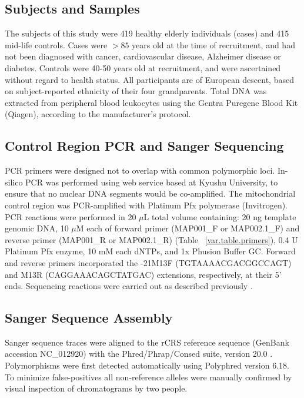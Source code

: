 \subsection{Subjects and Samples}\label{methods.samples}
The subjects of this study were 419 healthy elderly individuals (cases) and 415 mid-life controls.  Cases were $> 85$ years old at the time of recruitment, and had not been diagnosed with cancer, cardiovascular disease, Alzheimer disease or diabetes.  Controls were 40-50 years old at recruitment, and were ascertained without regard to health status.  All participants are of European descent, based on subject-reported ethnicity of their four grandparents.  Total DNA was extracted from peripheral blood leukocytes using the Gentra Puregene Blood Kit (Qiagen), according to the manufacturer's protocol.

\subsection{Control Region PCR and Sanger Sequencing}\label{var.methods.control_region}
PCR primers were designed not to overlap with common polymorphic loci. In-silico PCR was performed using web service based at Kyushu University, to ensure that no nuclear DNA segments would be co-amplified\cite{kyushu}.  The mitochondrial control region was PCR-amplified with Platinum Pfx polymerase (Invitrogen).  PCR reactions were performed in 20 $\mu$L total volume containing: 20 ng template genomic DNA, 10 $\mu$M each of forward primer (MAP001\_F or MAP002.1\_F) and reverse primer (MAP001\_R or MAP002.1\_R) (Table ~\ref{var.table.primers}), 0.4 U Platinum Pfx enzyme, 10 mM each dNTPs, and 1x Phusion Buffer GC.  Forward and reverse primers incorporated the -21M13F (TGTAAAACGACGGCCAGT) and M13R (CAGGAAACAGCTATGAC) extensions, respectively, at their 5' ends.  Sequencing reactions were carried out as described previously \cite{brooks2004germline}.

\subsection{Sanger Sequence Assembly}
Sanger sequence traces were aligned to the \ac{rCRS} reference sequence (GenBank accession NC\_012920) with the Phred/Phrap/Consed suite, version 20.0 \cite{gordon1998consed,ewing1998base1,ewing1998base2}.  Polymorphisms were first detected automatically using Polyphred version 6.18. To minimize false-positives all non-reference alleles were manually confirmed by visual inspection of chromatograms by two people.

